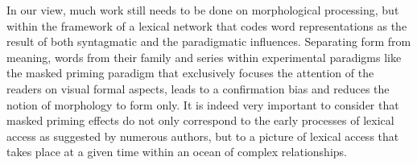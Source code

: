 \documentclass[output=paper]{langsci/langscibook}
\begin{document}
In our view, much work still needs to be done on morphological
processing, but within the framework of a lexical network that codes word
representations as the result of both syntagmatic and the paradigmatic
influences. Separating form from meaning, words from their family and
series within experimental paradigms like the masked priming paradigm
that exclusively focuses the attention of the readers on visual formal
aspects, leads to a confirmation bias and reduces the notion of
morphology to form only. It is indeed very important to consider that
masked priming effects do not only correspond to the early processes of
lexical access as suggested by numerous authors, but to a picture of
lexical access that takes place at a given time within an ocean of
complex relationships.





{\sloppy
\printbibliography[heading=subbibliography,notkeyword=this]
}
\end{document}
